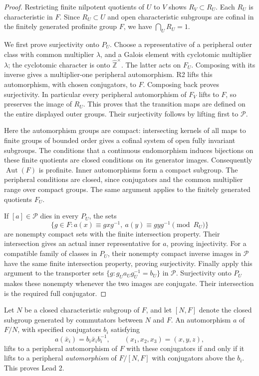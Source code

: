 \begin{proof}
Restricting finite nilpotent quotients of \(U\) to \(V\)
shows \(R_V\subset R_U\). Each \(R_U\) is characteristic in
\(F\). Since \(R_U\subset U\) and open characteristic
subgroups are cofinal in the finitely generated profinite
group \(F\), we have \(\bigcap_U R_U=1\).

We first prove surjectivity onto \(P_U\). Choose a representative
of a peripheral outer class with common multiplier \(\lambda\),
and a Galois element with cyclotomic multiplier \(\lambda\);
the cyclotomic character is onto
\(\widehat{\mathbb Z}^{\times}\). The latter acts on \(F_U\).
Composing with its inverse gives a multiplier-one peripheral
automorphism. R2 lifts this automorphism, with chosen
conjugators, to \(F\). Composing back proves surjectivity.
In particular every peripheral automorphism of \(F_V\)
lifts to \(F\), so preserves the image of \(R_U\).
This proves that the transition maps are defined on the
entire displayed outer groups. Their surjectivity follows
by lifting first to \(\mathcal P\).

Here the automorphism groups are compact: intersecting
kernels of all maps to finite groups of bounded order
gives a cofinal system of open fully invariant subgroups.
The conditions that a continuous endomorphism induces
bijections on these finite quotients are closed conditions
on its generator images. Consequently \(\operatorname{Aut}(F)\)
is profinite. Inner automorphisms form a compact subgroup.
The peripheral conditions are closed, since conjugators
and the common multiplier range over compact groups.
The same argument applies to the finitely generated
quotients \(F_U\).

If \([a]\in\mathcal P\) dies in every \(P_U\), the sets
\[
 \{g\in F:a(x)\equiv gxg^{-1},\
              a(y)\equiv gyg^{-1}\pmod {R_U}\}
\]
are nonempty compact sets with the finite intersection
property. Their intersection gives an actual inner
representative for \(a\), proving injectivity.
For a compatible family of classes in \(P_U\), their
nonempty compact inverse images in \(\mathcal P\) have
the same finite intersection property, proving surjectivity.
Finally apply this argument to the transporter sets
\(\{g:g_Ua_Ug_U^{-1}=b_U\}\) in \(\mathcal P\).
Surjectivity onto \(P_U\) makes these nonempty whenever
the two images are conjugate. Their intersection is the
required full conjugator.
\end{proof}

Let \(N\) be a closed characteristic subgroup of \(F\), and
let \([N,F]\) denote the closed subgroup generated by
commutators between \(N\) and \(F\).
An automorphism \(a\) of \(F/N\), with specified conjugators
\(b_i\) satisfying
\[
 a(\bar x_i)=b_i\bar x_i b_i^{-1},\qquad
 (x_1,x_2,x_3)=(x,y,z),
\]
lifts to a peripheral automorphism of \(F\) with these
conjugators if and only if it lifts to a peripheral
\emph{automorphism} of \(F/[N,F]\) with conjugators above
the \(b_i\). This proves Lead 2.

